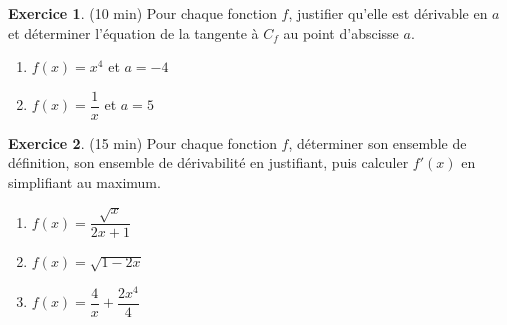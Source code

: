 \documentclass{exam}
\theoremstyle{definition}
\newtheorem{exercice}{Exercice}
\begin{document}
\begin{exercice}{(10 min)}
    Pour chaque fonction $f$, justifier qu’elle est dérivable en $a$ et déterminer l’équation de la tangente à $C_f$ au point d’abscisse $a$.
    \begin{enumerate}
        \item $f(x) = x^4$ et $a = -4$
        \item $f(x) = \dfrac{1}{x}$ et $a = 5$
    \end{enumerate}
    \end{exercice}
    
    \begin{exercice}{(15 min)}
    Pour chaque fonction $f$, déterminer son ensemble de définition, son ensemble de dérivabilité en justifiant, puis calculer $f'(x)$ en simplifiant au maximum.
    \begin{enumerate}
        \item $f(x) = \dfrac{\sqrt{x}}{2x + 1}$
        \item $f(x) = \sqrt{1 -2x}$
        \item $f(x) = \dfrac{4}{x} + \dfrac{2x^4}{4}$
    \end{enumerate}
    \end{exercice}
    
\end{document}
